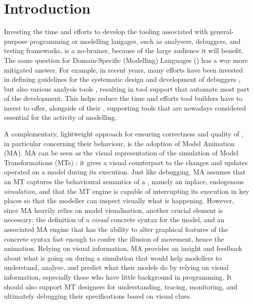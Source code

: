 \section{Introduction}
\label{sec:Introduction}

Investing the time and efforts to develop the tooling associated with general-purpose
programming or modelling langages, such as analysers, debuggers, and testing
frameworks, is a no-brainer, because of the large audience it will benefit.
The same question for Domain-Specific (Modelling) Languages (\DSMLs) has a
way more mitigated answer. For example, in recent years, many efforts have been
invested in defining guidelines for the systematic design and development of 
\DSL debuggers 
\cite{bousse2018omniscient,J:VanMierlo-Vangheluwe-etAl:2020,J:Corley-Eddy-Syriani-Grey:2016},
but also various analysis tools \cite{Meyers-Deshayes-etAl:2014}, resulting in
tool support that automate most part of the development. This helps reduce the
time and efforts \DSL tool builders have to invest to offer, alongside of their
\DSL, supporting tools that are nowadays considered essential for the activity
of \DSL modelling.

A complementary, lightweight approach for ensuring correctness and quality of
\DSLs, in particular concerning their behaviour, is the adoption of Model 
Animation (MA). MA can be seen as the visual representation of the simulation of
Model Transformations (MTs) \cite{J:Lucio-Amrani-etAl:2014}: it gives a visual 
counterpart to the changes and updates operated on a model during its execution.
Just like debugging, MA assumes that an MT captures the behavioural semantics 
of a \DSL, namely an inplace, endogenous \emph{simulation}, and that the MT 
engine is capable of interrupting its execution in key places so that the 
modeller can inspect visually what is happening. However,
since MA heavily relies on model visualisation, another crucial element is necessary:
the definition of a \emph{visual} concrete syntax for the model, and an associated
MA engine that has the ability to alter graphical features of the concrete syntax
fast enough to confer the illusion of movement, hence the animation. Relying
on visual information, MA provides an insight and feedback about what is going on
during a simulation that would help modellers to understand, analyse, and predict
what their models do by relying on visual information, especially those who have
little background in programming. It should also support MT designers for understanding,
tracing, monitoring, and ultimately debugging their specifications based on visual
clues.

